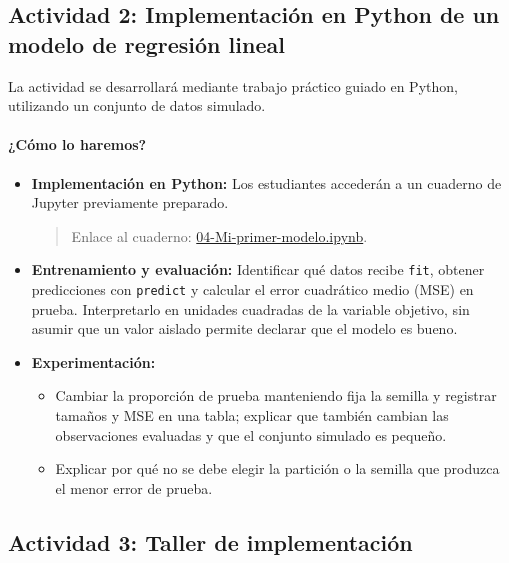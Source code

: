 \documentclass[a4,11pt]{aleph-notas}
\begin{document}
\subsection*{Actividad 2: Implementación en Python de un modelo de regresión lineal}

La actividad se desarrollará mediante trabajo práctico guiado en Python, utilizando un conjunto de datos simulado.

\paragraph{¿Cómo lo haremos?}
\begin{itemize}[leftmargin=*]
\item \textbf{Implementación en Python:} Los estudiantes accederán a un cuaderno de Jupyter previamente preparado.
\begin{quote}
Enlace al cuaderno: \href{https://colab.research.google.com/github/andres-merino/AprendizajeAutomaticoInicial-05-N0105/blob/main/2-Notebooks/04-Mi-primer-modelo.ipynb}{04-Mi-primer-modelo.ipynb}.
\end{quote}
\item \textbf{Entrenamiento y evaluación:} Identificar qué datos recibe \texttt{fit}, obtener predicciones con \texttt{predict} y calcular el error cuadrático medio (MSE) en prueba. Interpretarlo en unidades cuadradas de la variable objetivo, sin asumir que un valor aislado permite declarar que el modelo es bueno.
\item \textbf{Experimentación:}
\begin{itemize}
    \item Cambiar la proporción de prueba manteniendo fija la semilla y registrar tamaños y MSE en una tabla; explicar que también cambian las observaciones evaluadas y que el conjunto simulado es pequeño.
    \item Explicar por qué no se debe elegir la partición o la semilla que produzca el menor error de prueba.
\end{itemize}
\end{itemize}

\subsection*{Actividad 3: Taller de implementación}
\end{document}
